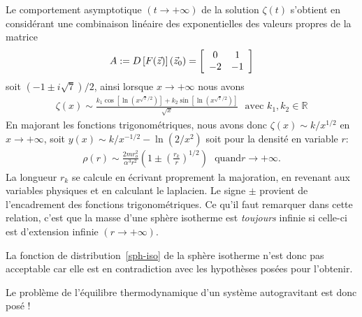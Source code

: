 Le comportement asymptotique $\left(t\rightarrow+\infty\right)$ de la
solution $\zeta(t)$ s'obtient en considérant une combinaison linéaire
des exponentielles des valeurs propres de la matrice
\begin{align*}
	A:=D\left[F(\vec{z})\right](\vec{z}_0)=\left[
\begin{array}
[c]{cc}%
0     & 1\\
-2 & -1\\
\end{array}
\right]
\end{align*}
soit $\left(  -1\pm i\sqrt
{7}\right)  /2$, ainsi lorsque $x\rightarrow+\infty$ nous avons
\begin{align*}
\zeta\left(  x\right)
\sim\frac{k_{1}\cos\left[  \ln\left(  x^{\sqrt{7}/2}\right)  \right]
+k_{2}\sin\left[  \ln\left(  x^{\sqrt{7}/2}\right)  \right]  }{\sqrt{x}%
}\ \ \ \text{avec }k_{1},k_{2}\in\mathbb{R}%
\end{align*}
En majorant les fonctions trigonométriques, nous avons donc $\zeta\left(
x\right)  \sim k/x^{1/2}$ en $x\rightarrow+\infty$, soit $y\left(  x\right)
\sim k/x^{-1/2}-\ln\left(  2/x^{2}\right)  $ soit pour la densité en
variable $r$:
\begin{align}
\rho\left(  r\right)  \sim\frac{2mr_{o}^{2}}{\alpha^{3}r^{2}}\left(
1\pm\left(  \frac{r_{k}}{r}\right)  ^{1/2}\right)  \ \ \ \text{quand
}r\rightarrow+\infty\text{.}\label{asymp_sph_iso}%
\end{align}
La longueur $r_{k}$ se calcule en écrivant proprement la majoration, en
revenant aux variables physiques et en calculant le laplacien. Le signe $\pm$ provient de l'encadrement des fonctions
trigonométriques. Ce qu'il faut remarquer dans cette
relation, c'est que la masse d'une sphère isotherme est \emph{toujours} infinie si
celle-ci est d'extension infinie $\left(  r\rightarrow+\infty\right)$.

La fonction de distribution~\ref{sph-iso} de la sphère isotherme n'est donc pas acceptable car elle est en contradiction avec les hypothèses posées pour l'obtenir.

Le problème de l'équilibre thermodynamique d'un système autogravitant est donc posé !

